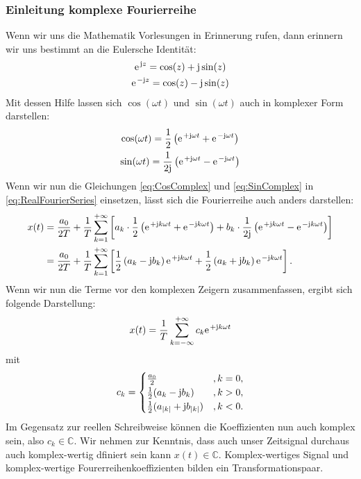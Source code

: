\documentclass[11pt,a4paper,DIV=12]{scrartcl}
\begin{document}
\subsubsection*{Einleitung komplexe Fourierreihe}
%
Wenn wir uns die Mathematik Vorlesungen in Erinnerung rufen, dann erinnern wir
uns bestimmt an die Eulersche Identität:
%
\begin{gather}
	\label{eq:EulerIdentity}
	\e^{\im z}=\cos(z)+\im\sin(z)\\
	\label{eq:ConjugatedEulerIdenity}
	\e^{-\im z}=\cos(z)-\im\sin(z)
\end{gather}
%
Mit dessen Hilfe lassen sich $\cos(\omega t)$ und $\sin(\omega t)$ auch in komplexer Form darstellen:
%
\begin{gather}
	\label{eq:CosComplex}
	\cos(\omega t)=\frac{1}{2}\left (\e^{+\im\omega t}+\e^{-\im\omega t}\right)\\
	\label{eq:SinComplex}
	\sin(\omega t)=\frac{1}{2\im}\left (\e^{+\im\omega t}-\e^{-\im\omega t}\right )
\end{gather}
%
Wenn wir nun die Gleichungen \eqref{eq:CosComplex} und \eqref{eq:SinComplex} in
\eqref{eq:RealFourierSeries} einsetzen, lässt sich die Fourierreihe auch anders
darstellen:
%
\begin{align}
	x(t)
	&=\frac{a_0}{2T}+\frac{1}{T}\sum_{k=1}^{+\infty}\left [a_k\cdot\frac{1}{2}\left (\e^{+\im k \omega t}+\e^{-\im k \omega t}\right)+b_k\cdot\frac{1}{2\im}\left (\e^{+\im k \omega t}-\e^{-\im k \omega t}\right )\right ]\\
	&=\frac{a_0}{2T}+\frac{1}{T}\sum_{k=1}^{+\infty}\left [\frac{1}{2}\left(a_k-\im b_k\right)\e^{+\im k \omega t}+\frac{1}{2}\left(a_k+\im b_k\right)\e^{-\im k \omega t}\right ].
\end{align}
%
Wenn wir nun die Terme vor den komplexen Zeigern zusammenfassen, ergibt sich folgende Darstellung:
%
\begin{align}
	x(t)=\frac{1}{T}\sum_{k=-\infty}^{+\infty}c_k\e^{+\im k \omega t}
\end{align}
%
mit
%
\begin{align}
	\label{eq:ComplexRealCoeffConnection}
	c_k=
		\begin{cases}
			\frac{a_0}{2} &,k=0 ,\\
			\frac{1}{2}(a_k-\im b_k) &,k>0,\\
			\frac{1}{2}(a_{|k|}+\im b_{|k|}) &,k<0.
		\end{cases}
\end{align}
%
Im Gegensatz zur reellen Schreibweise können die Koeffizienten nun auch komplex
sein, also $c_k\in\mathbb{C}$.
%
Wir nehmen zur Kenntnis, dass auch unser Zeitsignal durchaus auch
komplex-wertig dfiniert sein kann $x(t)\in\mathbb{C}$.
%
Komplex-wertiges Signal und komplex-wertige Fourerreihenkoeffizienten bilden
ein Transformationspaar.
\end{document}
